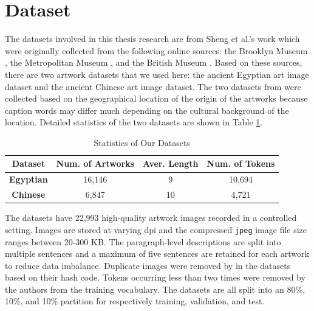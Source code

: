 \section{Dataset}

The datasets involved in this thesis research are from Sheng et al.'s work \cite{artworkcaption} which were originally collected from the following online sources: the Brooklyn Museum \cite{brooklynmuseum}, the Metropolitan Museum \cite{themet}, and the British Museum \cite{thebritishmuseum}. Based on these sources, there are two artwork datasets that we used here: the ancient Egyptian art image dataset and the ancient Chinese art image dataset. The two datasets from \cite{artworkcaption} were collected based on the geographical location of the origin of the artworks because caption words may differ much depending on the cultural background of the location. Detailed statistics of the two datasets are shown in Table \ref{fig:datasetstats}. 

\begin{table}[h!]
\centering
\begin{tabular}{|c|c|c|c|}
\hline
\textbf{Dataset}          & \textbf{Num. of Artworks} & \textbf{Aver. Length} & \textbf{Num. of Tokens} \\ \hline
\textbf{Egyptian} & 16,146                       & 9                       & 10,694                     \\ \hline
\textbf{Chinese}  & 6,847                        & 10                      & 4,721                      \\ \hline
\end{tabular}
\caption{Statistics of Our Datasets \cite{artworkcaption}}
\label{fig:datasetstats}
\end{table}

The datasets have 22,993 high-quality artwork images recorded
in a controlled setting. Images are stored at varying dpi and the
compressed \verb|jpeg| image file size ranges between 20-300 KB. The paragraph-level descriptions are split into multiple sentences and a maximum of five sentences are retained for each artwork to reduce data imbalance. Duplicate images were removed by \cite{artworkcaption} in the datasets based on their hash code. Tokens occurring less than two times were removed by the authors from the training vocabulary.
The datasets are all split into an 80\%, 10\%, and 10\% partition for respectively training, validation, and test.

